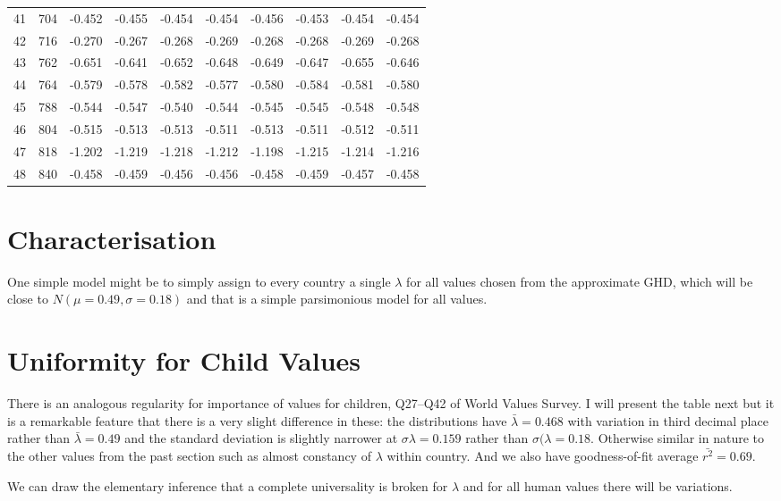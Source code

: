 \documentclass{amsart}
\begin{document}
\begin{longtable}{rrrrrrrrrr}
  41 & 704 & -0.452 & -0.455 & -0.454 & -0.454 & -0.456 & -0.453 & -0.454 & -0.454 \\ 
  42 & 716 & -0.270 & -0.267 & -0.268 & -0.269 & -0.268 & -0.268 & -0.269 & -0.268 \\ 
  43 & 762 & -0.651 & -0.641 & -0.652 & -0.648 & -0.649 & -0.647 & -0.655 & -0.646 \\ 
  44 & 764 & -0.579 & -0.578 & -0.582 & -0.577 & -0.580 & -0.584 & -0.581 & -0.580 \\ 
  45 & 788 & -0.544 & -0.547 & -0.540 & -0.544 & -0.545 & -0.545 & -0.548 & -0.548 \\ 
  46 & 804 & -0.515 & -0.513 & -0.513 & -0.511 & -0.513 & -0.511 & -0.512 & -0.511 \\ 
  47 & 818 & -1.202 & -1.219 & -1.218 & -1.212 & -1.198 & -1.215 & -1.214 & -1.216 \\ 
  48 & 840 & -0.458 & -0.459 & -0.456 & -0.456 & -0.458 & -0.459 & -0.457 & -0.458 \\ 
   \hline
\hline
\end{longtable}

\section{Characterisation}
One simple model might be to simply assign to every country a single $\lambda$ for all values chosen from the approximate GHD, which will be close to $N(\mu=0.49, \sigma=0.18)$ and that is a simple parsimonious model for all values.  

\section{Uniformity for Child Values}

There is an analogous regularity for importance of values for children, Q27--Q42 of World Values Survey.  I will present the table next but it is a remarkable feature that there is a very slight difference in these: the distributions have $\bar{\lambda}=0.468$ with variation in third decimal place rather than $\bar{\lambda}=0.49$ and the standard deviation is slightly narrower at $\sigma{\lambda}=0.159$ rather than $\sigma(\lambda=0.18$. Otherwise similar in nature to the other values from the past section such as almost constancy of $\lambda$ within country.  And we also have goodness-of-fit average $\bar{r^2} = 0.69$. 

We can draw the elementary inference that a complete universality is broken for $\lambda$ and for all human values there will be variations.  
\end{document}
